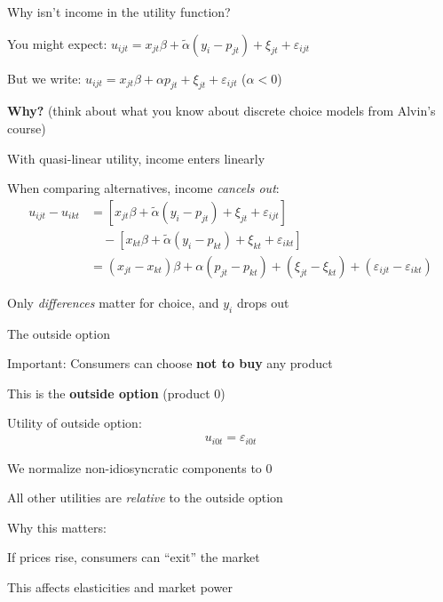 \documentclass[notes,11pt, aspectratio=169]{beamer}
\newenvironment{wideitemize}{\itemize\addtolength{\itemsep}{10pt}}{\enditemize}
\begin{document}
\begin{frame}{Why isn't income in the utility function?}
	\begin{wideitemize}
		\item You might expect: $u_{ijt} = x_{jt} \beta + \tilde{\alpha} (y_i - p_{jt}) + \xi_{jt} + \varepsilon_{ijt}$
		\item But we write: $u_{ijt} = x_{jt} \beta + \alpha p_{jt} + \xi_{jt} + \varepsilon_{ijt}$ \quad ($\alpha < 0$)
		\item \textbf{Why?} (think about what you know about discrete choice models from Alvin's course) \pause
		\item With quasi-linear utility, income enters linearly
		\item When comparing alternatives, income \textit{cancels out}:
		\begin{align*}
			u_{ijt} - u_{ikt} &= [x_{jt} \beta + \tilde{\alpha}(y_i - p_{jt}) + \xi_{jt} + \varepsilon_{ijt}] \\
			&\quad - [x_{kt} \beta + \tilde{\alpha}(y_i - p_{kt}) + \xi_{kt} + \varepsilon_{ikt}] \\
			&= (x_{jt} - x_{kt})\beta + \alpha(p_{jt} - p_{kt}) + (\xi_{jt} - \xi_{kt}) + (\varepsilon_{ijt} - \varepsilon_{ikt})
		\end{align*}
		\item Only \textit{differences} matter for choice, and $y_i$ drops out
	\end{wideitemize}
\end{frame}

\begin{frame}{The outside option}
	\begin{wideitemize}
		\item Important: Consumers can choose \textbf{not to buy} any product
		\item This is the \textbf{outside option} (product 0)
		\item Utility of outside option:
		\begin{align*}
			u_{i0t} = \varepsilon_{i0t}
		\end{align*}
		\item We normalize non-idiosyncratic components to 0
		\item All other utilities are \textit{relative} to the outside option
		\item Why this matters:
		\begin{wideitemize}
			\vspace{5pt}
			\item If prices rise, consumers can ``exit'' the market
			\item This affects elasticities and market power
		\end{wideitemize}
	\end{wideitemize}
\end{frame}
\end{document}
